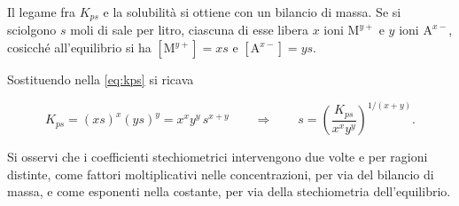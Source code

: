 Il legame fra $K_{ps}$ e la solubilità si ottiene con un bilancio di massa.
Se si sciolgono $s$ moli di sale per litro, ciascuna di esse libera $x$ ioni $\mathrm{M}^{y+}$ e $y$ ioni $\mathrm{A}^{x-}$, cosicché all'equilibrio si ha $[\mathrm{M}^{y+}] = xs$ e $[\mathrm{A}^{x-}] = ys$.

Sostituendo nella \eqref{eq:kps} si ricava

\begin{equation}
    K_{ps} = (xs)^x (ys)^y = x^x y^y\, s^{x+y}
    \qquad\Longrightarrow\qquad
    s = \left(\frac{K_{ps}}{x^x y^y}\right)^{1/(x+y)} .
    \label{eq:kps_generale}
\end{equation}

Si osservi che i coefficienti stechiometrici intervengono due volte e per ragioni distinte, come fattori moltiplicativi nelle concentrazioni, per via del bilancio di massa, e come esponenti nella costante, per via della stechiometria dell'equilibrio.
